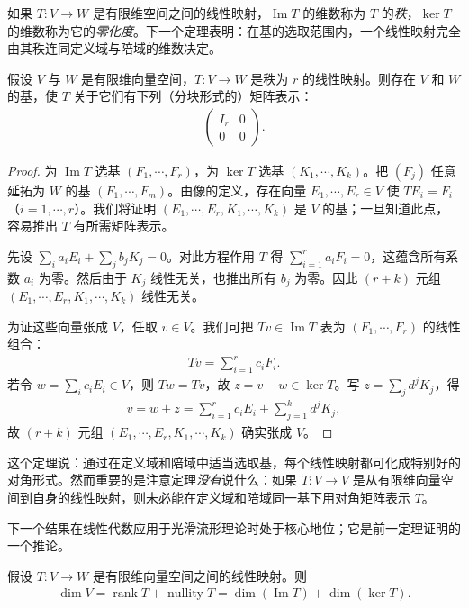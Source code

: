 \documentclass[../../main.tex]{subfiles}
\begin{document}
如果 $T:V\to W$ 是有限维空间之间的线性映射，$\operatorname{Im}T$ 的维数称为 $T$ 的\emph{秩}，$\ker T$ 的维数称为它的\emph{零化度}。下一个定理表明：在基的选取范围内，一个线性映射完全由其秩连同定义域与陪域的维数决定。

\begin{theorem}[线性映射的典范形式]\label{theorem:appB-linear-map-canonical}
假设 $V$ 与 $W$ 是有限维向量空间，$T:V\to W$ 是秩为 $r$ 的线性映射。则存在 $V$ 和 $W$ 的基，使 $T$ 关于它们有下列（分块形式的）矩阵表示：
\begin{align*}
\begin{pmatrix}I_r&0\\0&0\end{pmatrix}.
\end{align*}
\end{theorem}

\begin{proof}
为 $\operatorname{Im}T$ 选基 $(F_1,\cdots ,F_r)$，为 $\ker T$ 选基 $(K_1,\cdots ,K_k)$。把 $(F_j)$ 任意延拓为 $W$ 的基 $(F_1,\cdots ,F_m)$。由像的定义，存在向量 $E_1,\cdots ,E_r\in V$ 使 $TE_i=F_i$（$i=1,\cdots ,r$）。我们将证明 $(E_1,\cdots ,E_r,K_1,\cdots ,K_k)$ 是 $V$ 的基；一旦知道此点，容易推出 $T$ 有所需矩阵表示。

先设 $\sum_i a_iE_i+\sum_j b_jK_j=0$。对此方程作用 $T$ 得 $\sum_{i=1}^r a_iF_i=0$，这蕴含所有系数 $a_i$ 为零。然后由于 $K_j$ 线性无关，也推出所有 $b_j$ 为零。因此 $(r+k)$ 元组 $(E_1,\cdots ,E_r,K_1,\cdots ,K_k)$ 线性无关。

为证这些向量张成 $V$，任取 $v\in V$。我们可把 $Tv\in\operatorname{Im}T$ 表为 $(F_1,\cdots ,F_r)$ 的线性组合：
\begin{align*}
Tv=\sum_{i=1}^r c_iF_i.
\end{align*}
若令 $w=\sum_i c_iE_i\in V$，则 $Tw=Tv$，故 $z=v-w\in\ker T$。写 $z=\sum_j d^jK_j$，得
\begin{align*}
v=w+z=\sum_{i=1}^r c_iE_i+\sum_{j=1}^k d^jK_j,
\end{align*}
故 $(r+k)$ 元组 $(E_1,\cdots ,E_r,K_1,\cdots ,K_k)$ 确实张成 $V$。
\end{proof}

这个定理说：通过在定义域和陪域中适当选取基，每个线性映射都可化成特别好的对角形式。然而重要的是注意定理\emph{没有}说什么：如果 $T:V\to V$ 是从有限维向量空间到自身的线性映射，则未必能在定义域和陪域同一基下用对角矩阵表示 $T$。

下一个结果在线性代数应用于光滑流形理论时处于核心地位；它是前一定理证明的一个推论。

\begin{corollary}[秩--零维定律]\label{corollary:appB-rank-nullity}
假设 $T:V\to W$ 是有限维向量空间之间的线性映射。则
\begin{align*}
\dim V=\operatorname{rank}T+\operatorname{nullity}T
=\dim(\operatorname{Im}T)+\dim(\ker T).
\end{align*}
\end{corollary}
\end{document}
